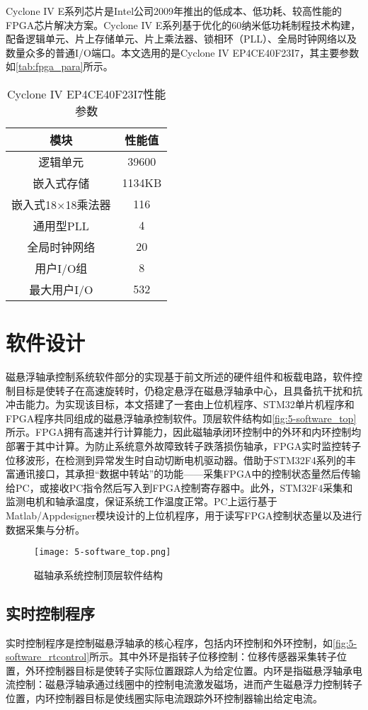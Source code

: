\documentclass[
  lang=cn,
  degree=master,
  openany,oneside
]{nuaathesis}
\begin{document}
Cyclone IV E系列芯片是Intel公司2009年推出的低成本、低功耗、较高性能的FPGA芯片解决方案。Cyclone IV E系列基于优化的60纳米低功耗制程技术构建，配备逻辑单元、片上存储单元、片上乘法器、锁相环（PLL）、全局时钟网络以及数量众多的普通I/O端口。本文选用的是Cyclone IV EP4CE40F23I7，其主要参数如\autoref{tab:fpga_para}所示。

\begin{table}[h!]
  \caption[Cyclone IV EP4CE40F23I7性能参数]{Cyclone IV EP4CE40F23I7性能参数\label{tab:fpga_para}}
  \begin{tabular}{cc}
    \toprule
    模块 & 性能值 \\
    \midrule
    逻辑单元 & 39600\\
    嵌入式存储 & 1134KB\\
    嵌入式18$\times$18乘法器 & 116\\
    通用型PLL & 4\\
    全局时钟网络 & 20\\
    用户I/O组 & 8\\
    最大用户I/O & 532	\\
    \bottomrule
  \end{tabular}
\end{table}

\section{软件设计}
磁悬浮轴承控制系统软件部分的实现基于前文所述的硬件组件和板载电路，软件控制目标是使转子在高速旋转时，仍稳定悬浮在磁悬浮轴承中心，且具备抗干扰和抗冲击能力。为实现该目标，本文搭建了一套由上位机程序、STM32单片机程序和FPGA程序共同组成的磁悬浮轴承控制软件。顶层软件结构如\autoref{fig:5-software_top}所示。FPGA拥有高速并行计算能力，因此磁轴承闭环控制中的外环和内环控制均部署于其中计算。为防止系统意外故障致转子跌落损伤轴承，FPGA实时监控转子位移波形，在检测到异常发生时自动切断电机驱动器。借助于STM32F4系列的丰富通讯接口，其承担“数据中转站”的功能——采集FPGA中的控制状态量然后传输给PC，或接收PC指令然后写入到FPGA控制寄存器中。此外，STM32F4采集和监测电机和轴承温度，保证系统工作温度正常。PC上运行基于Matlab/Appdesigner模块设计的上位机程序，用于读写FPGA控制状态量以及进行数据采集与分析。

\begin{figure}[h!]
	\texttt{[image: 5-software\_top.png]}
	\caption{磁轴承系统控制顶层软件结构}
	\label{fig:5-software_top}
\end{figure}

\subsection{实时控制程序}
实时控制程序是控制磁悬浮轴承的核心程序，包括内环控制和外环控制，如\autoref{fig:5-software_rtcontrol}所示。其中外环是指转子位移控制：位移传感器采集转子位置，外环控制器目标是使转子实际位置跟踪人为给定位置。内环是指磁悬浮轴承电流控制：磁悬浮轴承通过线圈中的控制电流激发磁场，进而产生磁悬浮力控制转子位置，内环控制器目标是使线圈实际电流跟踪外环控制器输出给定电流。
\end{document}
